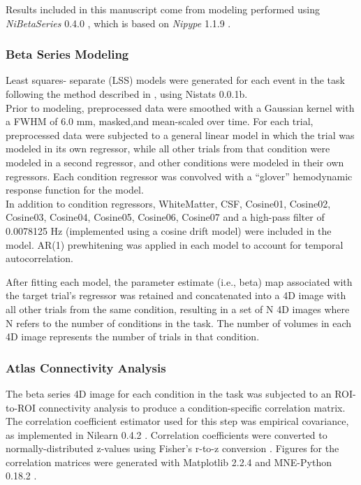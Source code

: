 \documentclass[
]{article}
\date{}
\begin{document}
Results included in this manuscript come from modeling performed using
\emph{NiBetaSeries} 0.4.0 \citep{Kent2018}, which is based on
\emph{Nipype} 1.1.9 \citep{Gorgolewski2011, Gorgolewski2018}.

\hypertarget{beta-series-modeling}{%
\subsubsection{Beta Series Modeling}\label{beta-series-modeling}}

Least squares- separate (LSS) models were generated for each event in
the task following the method described in \citet{Turner2012a}, using
Nistats 0.0.1b.\\
Prior to modeling, preprocessed data were smoothed with a Gaussian
kernel with a FWHM of 6.0 mm, masked,and mean-scaled over time. For each
trial, preprocessed data were subjected to a general linear model in
which the trial was modeled in its own regressor, while all other trials
from that condition were modeled in a second regressor, and other
conditions were modeled in their own regressors. Each condition
regressor was convolved with a ``glover'' hemodynamic response function
for the model.\\
In addition to condition regressors, WhiteMatter, CSF, Cosine01,
Cosine02, Cosine03, Cosine04, Cosine05, Cosine06, Cosine07 and a
high-pass filter of 0.0078125 Hz (implemented using a cosine drift
model) were included in the model. AR(1) prewhitening was applied in
each model to account for temporal autocorrelation.

After fitting each model, the parameter estimate (i.e., beta) map
associated with the target trial's regressor was retained and
concatenated into a 4D image with all other trials from the same
condition, resulting in a set of N 4D images where N refers to the
number of conditions in the task. The number of volumes in each 4D image
represents the number of trials in that condition.

\hypertarget{atlas-connectivity-analysis}{%
\subsubsection{Atlas Connectivity
Analysis}\label{atlas-connectivity-analysis}}

The beta series 4D image for each condition in the task was subjected to
an ROI-to-ROI connectivity analysis to produce a condition-specific
correlation matrix. The correlation coefficient estimator used for this
step was empirical covariance, as implemented in Nilearn 0.4.2
\citep{Abraham2014}. Correlation coefficients were converted to
normally-distributed z-values using Fisher's r-to-z conversion
\citep{Fisher1915}. Figures for the correlation matrices were generated
with Matplotlib 2.2.4 \citep{Hunter2007} and MNE-Python 0.18.2
\citep{Gramfort2013, Gramfort2014}.
\end{document}
